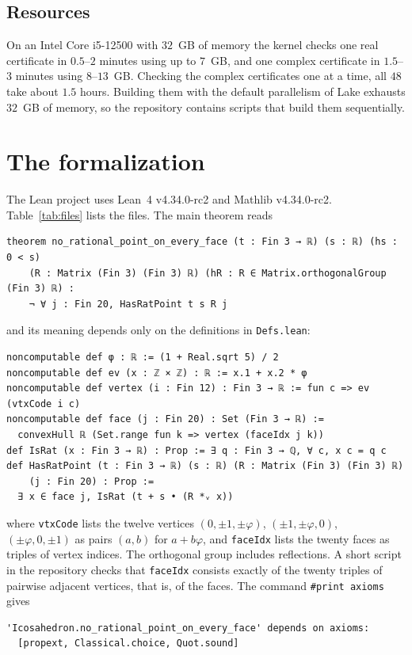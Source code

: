 \documentclass[11pt]{article}
\theoremstyle{definition}
\theoremstyle{remark}
\begin{document}
\subsection{Resources}
On an Intel Core i5-12500 with $32$~GB of memory the kernel checks one real certificate in
$0.5$--$2$ minutes using up to $7$~GB, and one complex certificate in $1.5$--$3$ minutes using $8$--$13$~GB.
Checking the complex certificates one at a time, all $48$ take about $1.5$ hours. Building them with the
default parallelism of Lake exhausts $32$~GB of memory, so the repository contains scripts that build
them sequentially.

\section{The formalization}\label{sec:formal}

The Lean project \cite{Repo} uses Lean~4 v4.34.0-rc2 and Mathlib v4.34.0-rc2. Table~\ref{tab:files}
lists the files. The main theorem reads
\begin{verbatim}
theorem no_rational_point_on_every_face (t : Fin 3 → ℝ) (s : ℝ) (hs : 0 < s)
    (R : Matrix (Fin 3) (Fin 3) ℝ) (hR : R ∈ Matrix.orthogonalGroup (Fin 3) ℝ) :
    ¬ ∀ j : Fin 20, HasRatPoint t s R j
\end{verbatim}
and its meaning depends only on the definitions in \texttt{Defs.lean}:
\begin{verbatim}
noncomputable def φ : ℝ := (1 + Real.sqrt 5) / 2
noncomputable def ev (x : ℤ × ℤ) : ℝ := x.1 + x.2 * φ
noncomputable def vertex (i : Fin 12) : Fin 3 → ℝ := fun c => ev (vtxCode i c)
noncomputable def face (j : Fin 20) : Set (Fin 3 → ℝ) :=
  convexHull ℝ (Set.range fun k => vertex (faceIdx j k))
def IsRat (x : Fin 3 → ℝ) : Prop := ∃ q : Fin 3 → ℚ, ∀ c, x c = q c
def HasRatPoint (t : Fin 3 → ℝ) (s : ℝ) (R : Matrix (Fin 3) (Fin 3) ℝ)
    (j : Fin 20) : Prop :=
  ∃ x ∈ face j, IsRat (t + s • (R *ᵥ x))
\end{verbatim}
where \texttt{vtxCode} lists the twelve vertices $(0,\pm1,\pm\varphi)$, $(\pm1,\pm\varphi,0)$,
$(\pm\varphi,0,\pm1)$ as pairs $(a,b)$ for $a+b\varphi$, and \texttt{faceIdx} lists the twenty faces as
triples of vertex indices. The orthogonal group includes reflections. A short script in the
repository checks that \texttt{faceIdx} consists exactly of the twenty triples of pairwise adjacent
vertices, that is, of the faces. The command \texttt{\#print axioms} gives
\begin{verbatim}
'Icosahedron.no_rational_point_on_every_face' depends on axioms:
  [propext, Classical.choice, Quot.sound]
\end{verbatim}
\end{document}
